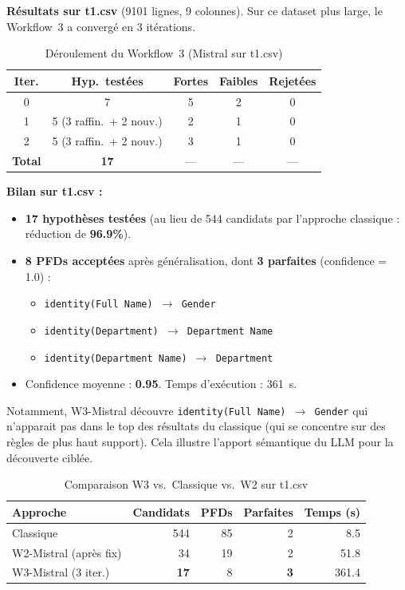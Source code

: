 \documentclass[12pt,a4paper]{article}
\begin{document}
\textbf{R\'{e}sultats sur t1.csv} (9101 lignes, 9 colonnes). Sur ce dataset plus large, le Workflow~3 a converg\'{e} en 3 it\'{e}rations.

\begin{table}[H]
\centering
\caption{D\'{e}roulement du Workflow~3 (Mistral sur t1.csv)}
\label{tab:w3-t1}
\small
\begin{tabular}{@{}ccccc@{}}
\toprule
\textbf{Iter.} & \textbf{Hyp.\ test\'{e}es} & \textbf{Fortes} & \textbf{Faibles} & \textbf{Rejet\'{e}es} \\
\midrule
0 & 7 & 5 & 2 & 0 \\
1 & 5 (3 raffin.\ + 2 nouv.) & 2 & 1 & 0 \\
2 & 5 (3 raffin.\ + 2 nouv.) & 3 & 1 & 0 \\
\midrule
\textbf{Total} & \textbf{17} & --- & --- & --- \\
\bottomrule
\end{tabular}
\end{table}

\textbf{Bilan sur t1.csv :}
\begin{itemize}
    \item \textbf{17 hypoth\`{e}ses test\'{e}es} (au lieu de 544 candidats par l'approche classique : r\'{e}duction de \textbf{96.9\%}).
    \item \textbf{8 PFDs accept\'{e}es} apr\`{e}s g\'{e}n\'{e}ralisation, dont \textbf{3 parfaites} (confidence = 1.0) :
    \begin{itemize}
        \item \texttt{identity(Full Name) $\to$ Gender}
        \item \texttt{identity(Department) $\to$ Department Name}
        \item \texttt{identity(Department Name) $\to$ Department}
    \end{itemize}
    \item Confidence moyenne : \textbf{0.95}. Temps d'ex\'{e}cution : 361~s.
\end{itemize}

Notamment, W3-Mistral d\'{e}couvre \texttt{identity(Full Name) $\to$ Gender} qui n'apparait pas dans le top des r\'{e}sultats du classique (qui se concentre sur des r\`{e}gles de plus haut support). Cela illustre l'apport s\'{e}mantique du LLM pour la d\'{e}couverte cibl\'{e}e.

\begin{table}[H]
\centering
\caption{Comparaison W3 vs.\ Classique vs.\ W2 sur t1.csv}
\label{tab:w3-comparison}
\small
\begin{tabular}{@{}lrrrr@{}}
\toprule
\textbf{Approche} & \textbf{Candidats} & \textbf{PFDs} & \textbf{Parfaites} & \textbf{Temps (s)} \\
\midrule
Classique & 544 & 85 & 2 & 8.5 \\
W2-Mistral (apr\`{e}s fix) & 34 & 19 & 2 & 51.8 \\
W3-Mistral (3 iter.) & \textbf{17} & 8 & \textbf{3} & 361.4 \\
\bottomrule
\end{tabular}
\end{table}
\end{document}
